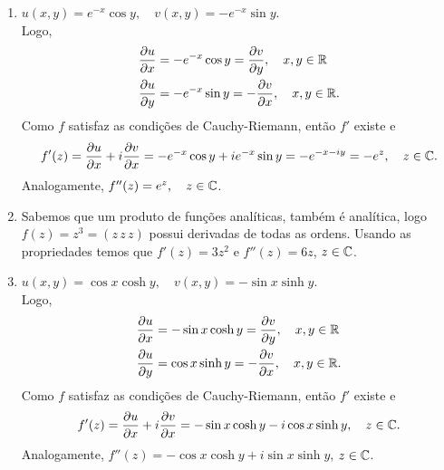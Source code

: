 \begin{questions}
\begin{solution}
\begin{enumerate}[label=(\alph*)]
        \item $u(x,y) = e^{-x}\cos y, \quad v(x,y) = -e^{-x}\sin y$.\\ Logo, \vspace{-5mm}
        \begin{align*}
          \frac{\partial u}{\partial x} &= -e^{-x}\cos y = \frac{\partial v}{\partial y}, \quad x,y\in{\mathbb R}\\
          \frac{\partial u}{\partial y} &= -e^{-x}\sin y  = -\frac{\partial v}{\partial x}, \quad x,y\in{\mathbb R}.
        \end{align*}
        Como $f$ satisfaz as condições de Cauchy-Riemann, então $f'$ existe e
        \[ f'(z) = \frac{\partial u}{\partial x} + i\frac{\partial v}{\partial x} = -e^{-x}\cos y + i e^{-x}\sin y
            = -e^{-x-iy} = -e^z, \quad z\in{\mathbb C}. \]
        Analogamente, $f''(z) = e^z,\quad z\in{\mathbb C}$.
        
        \item Sabemos que um produto de funções analíticas, também é analítica, logo $f(z) = z^3 = (z\,z\,z)$ possui derivadas de todas as ordens. Usando as propriedades temos que $f'(z) = 3z^2$ e $f''(z) = 6z$, $z\in{\mathbb C}$.
        
        \item $u(x,y) = \cos x \cosh y, \quad v(x,y) = -\sin x \sinh y$.\\ Logo, \vspace{-5mm}
        \begin{align*}
          \frac{\partial u}{\partial x} &= -\sin x \cosh y = \frac{\partial v}{\partial y}, \quad x,y\in{\mathbb R}\\
          \frac{\partial u}{\partial y} &= \cos x \sinh y  = -\frac{\partial v}{\partial x}, \quad x,y\in{\mathbb R}.
        \end{align*}
        Como $f$ satisfaz as condições de Cauchy-Riemann, então $f'$ existe e
        \[ f'(z) = \frac{\partial u}{\partial x} + i\frac{\partial v}{\partial x} = -\sin x \cosh y - i \cos x \sinh y, \quad z\in{\mathbb C}. \]
        Analogamente, $f''(z) = -\cos x \cosh y + i \sin x \sinh y$, $z\in{\mathbb C}$.
        
    \end{enumerate}
\end{solution}


\end{questions}
